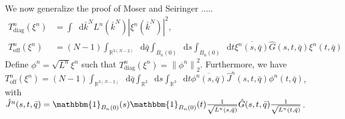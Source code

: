 \documentclass[a4paper,11pt]{article}
\newcommand{\norm}[1]{\left\lVert #1 \right\rVert}
\newcommand{\abs}[1]{\left\lvert #1 \right\rvert}
\newcommand*\diff{\mathop{}\!\mathrm{d}}
\newcommand{\R}{\mathbb{R}}
\numberwithin{equation}{section}
\begin{document}
We now generalize the proof of Moser and Seiringer \cite{Moser_2017}.....\\
\begin{equation}
\begin{aligned}
T^n_{\text{diag}}(\xi^n)&=\int\diff\bar{k}^N L^n(\bar{k}^N)\abs{\xi^n(\bar{k}^N)}^2,\\ T^n_{\text{off}}(\xi^n)&=(N-1)\int_{\R^{3(N-2)}}\diff \bar{q}\int_{B_n(0)}\diff s\int_{B_n(0)}\diff t\overline{\xi^n(s,\bar{q})}\hat{G}(s,t,\bar{q})\xi^n(t,\bar{q})
\end{aligned}
\end{equation}
Define $ \phi^n=\sqrt{L^n}\xi^n $ such that $ T^n_{\text{diag}}(\xi^n)=\norm{\phi^n}_2^2 $. Furthermore, we have\\ $ T^n_{\text{off}}(\xi^n)=(N-1)\int_{\R^{3(N-2)}}\diff \bar{q}\int_{\R^3}\diff s\int_{\R^3}\diff t\overline{\phi^n(s,\bar{q})}\hat{J}^n(s,t,\bar{q})\phi^n(t,\bar{q}) $, with\\ $ \hat{J}^n(s,t,\bar{q})=\mathbbm{1}_{B_n(0)}(s)\mathbbm{1}_{B_n(0)}(t)\frac{1}{\sqrt{L^n(s,\bar{q})}}\hat{G}(s,t,\bar{q})\frac{1}{\sqrt{L^n(t,\bar{q})}} $.
\end{document}

